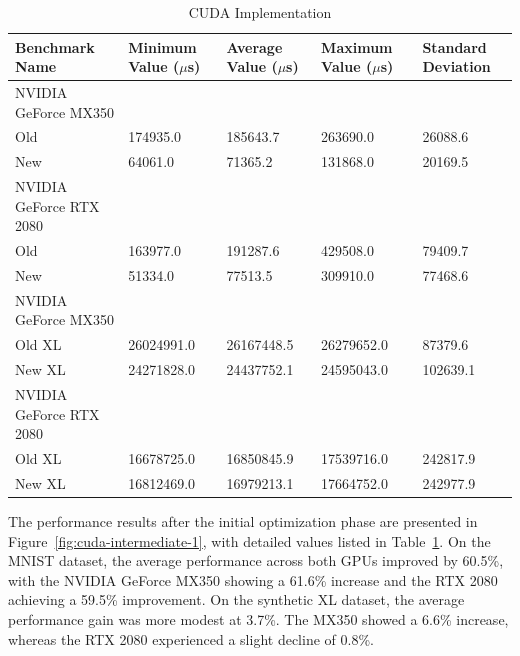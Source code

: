 \documentclass[modern,longauthor]{aastex7}
\begin{document}
\begin{table}[htb!]
\centering
\caption{CUDA Implementation\label{tab:cuda-intermediate-1}}
\begin{tabular}{p{5.5cm} p{2cm} p{2cm} p{2cm} p{2cm}}
\hline
Benchmark Name & Minimum Value ($\mu$s) & Average Value ($\mu$s) & Maximum Value ($\mu$s) & Standard Deviation \\
\hline
NVIDIA GeForce MX350 \\
\hspace{0.5cm}Old & 174935.0 & 185643.7 & 263690.0 & 26088.6 \\
\hspace{0.5cm}New & 64061.0 & 71365.2 & 131868.0 & 20169.5 \\
NVIDIA GeForce RTX 2080 \\
\hspace{0.5cm}Old & 163977.0 & 191287.6 & 429508.0 & 79409.7 \\
\hspace{0.5cm}New & 51334.0 & 77513.5 & 309910.0 & 77468.6 \\
\hline
NVIDIA GeForce MX350 \\
\hspace{0.5cm}Old XL & 26024991.0 & 26167448.5 & 26279652.0 & 87379.6 \\
\hspace{0.5cm}New XL & 24271828.0 & 24437752.1 & 24595043.0 & 102639.1 \\
NVIDIA GeForce RTX 2080 \\
\hspace{0.5cm}Old XL & 16678725.0 & 16850845.9 & 17539716.0 & 242817.9 \\
\hspace{0.5cm}New XL & 16812469.0 & 16979213.1 & 17664752.0 & 242977.9 \\
\hline
\end{tabular}
\end{table}
\FloatBarrier

The performance results after the initial optimization phase are presented in Figure~\ref{fig:cuda-intermediate-1}, with detailed values listed in Table~\ref{tab:cuda-intermediate-1}. On the MNIST dataset, the average performance across both GPUs improved by 60.5\%, with the NVIDIA GeForce MX350 showing a 61.6\% increase and the RTX 2080 achieving a 59.5\% improvement. On the synthetic XL dataset, the average performance gain was more modest at 3.7\%. The MX350 showed a 6.6\% increase, whereas the RTX 2080 experienced a slight decline of 0.8\%.
\end{document}
